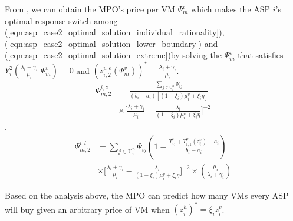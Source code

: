 \documentclass[conference]{IEEEtran}
\begin{document}
From , we can obtain the MPO's price per VM $\Psi_m^i$ which makes the ASP $i$'s optimal response switch among (\ref{eqn:asp_case2_optimal_solution_individual_rationality}), (\ref{eqn:asp_case2_optimal_solution_lower_boundary}) and (\ref{eqn:asp_case2_optimal_solution_extreme})by solving the $\Psi_m^v$ that satisfies $Y_i^2(\frac{\lambda_i+\gamma_i}{\mu_i}|\Psi_m^v) = 0$ and $(z_{i,2}^{v,e}(\Psi_m^v))^* = \frac{\lambda_i+\gamma_i}{\mu_i}$.
\begin{equation}
\begin{aligned}
\Psi_{m,2}^{i,z}&= \frac{\sum_{j \in \mathrm{U}_i^n}\Psi_{ij}}{(b_i-a_i)[(1-\xi_i)\mu_i^v + \xi_i \eta]} \\
& \times \big[\frac{\lambda_i+\gamma_i}{\mu_i} - \frac{\lambda_i}{(1-\xi_i)\mu_i^v + \xi_i\eta}\big]^{-2}
\end{aligned}
\end{equation}.
\begin{equation}
\begin{aligned}
\Psi_{m,2}^{i,l}&= \sum_{j \in \mathrm{U}_i^n}\Psi_{ij}(1-\frac{T_{ij}^t + T_{i,1}^p(z_i^v)-a_i}{b_i-a_i}) \\
& \times \big[\frac{\lambda_i+\gamma_i}{\mu_i} - \frac{\lambda_i}{(1-\xi_i)\mu_i^v + \xi_i\eta}\big]^{-2} \times (\frac{\mu_i}{\lambda_i+\gamma_i})
\end{aligned}
\end{equation}

Based on the analysis above, the MPO can predict how many VMs every ASP will buy given an arbitrary price of VM when $(z_i^h)^* = \xi_i z_i^v$.
\end{document}
